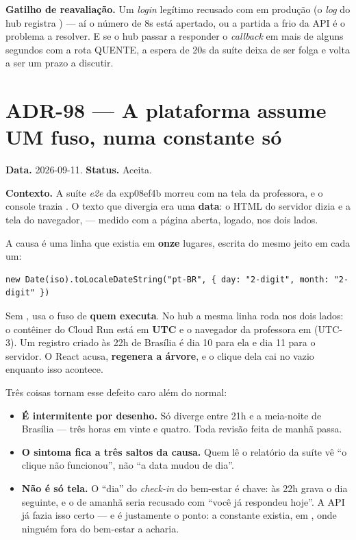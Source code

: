 \textbf{Gatilho de reavaliação.} Um \emph{login} legítimo recusado com
 em produção (o \emph{log} do hub registra
) --- aí o número de 8s está
apertado, ou a partida a frio da API é o problema a resolver. E se o hub passar
a responder o \emph{callback} em mais de alguns segundos com a rota QUENTE, a
espera de 20s da suíte deixa de ser folga e volta a ser um prazo a discutir.

\section{ADR-98 --- A plataforma assume UM fuso, numa constante só}
\label{adr:fuso-da-plataforma}

\textbf{Data.} 2026-09-11. \textbf{Status.} Aceita.

\textbf{Contexto.} A suíte \emph{e2e} da exp08ef4b morreu com
 na tela da professora, e o console
trazia . O texto que divergia era uma \textbf{data}: o HTML do servidor dizia
 e a tela do navegador,  --- medido com a página
aberta, logado, nos dois lados.

A causa é uma linha que existia em \textbf{onze} lugares, escrita do mesmo jeito
em cada um:

\begin{lstlisting}[language=tsunoo]
new Date(iso).toLocaleDateString("pt-BR", { day: "2-digit", month: "2-digit" })
\end{lstlisting}

Sem ,  usa o fuso de \textbf{quem executa}. No hub a mesma
linha roda nos dois lados: o contêiner do Cloud Run está em \textbf{UTC} e o
navegador da professora em  (UTC-3). Um registro criado
às 22h de Brasília é dia 10 para ela e dia 11 para o servidor. O React acusa,
\textbf{regenera a árvore}, e o clique dela cai no vazio enquanto isso acontece.

Três coisas tornam esse defeito caro além do normal:

\begin{itemize}
  \item \textbf{É intermitente por desenho.} Só diverge entre 21h e a
    meia-noite de Brasília --- três horas em vinte e quatro. Toda revisão feita
    de manhã passa.
  \item \textbf{O sintoma fica a três saltos da causa.} Quem lê o relatório da
    suíte vê \enquote{o clique não funcionou}, não \enquote{a data mudou de
    dia}.
  \item \textbf{Não é só tela.} O \enquote{dia} do \emph{check-in} do bem-estar
    é chave:  às 22h grava o dia seguinte, e o
    de amanhã seria recusado com \enquote{você já respondeu hoje}. A API já
    fazia isso certo --- e é justamente o ponto: a constante existia, em
    , onde ninguém fora do bem-estar a acharia.

\end{itemize}

